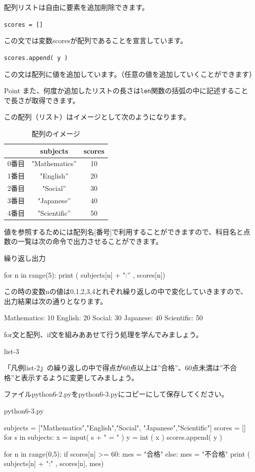 \documentclass[11pt,a4paper,dvipdfmx,titlepage]{jsreport}
\begin{document}
配列リストは自由に要素を追加削除できます。

{\tt scores = []}

この文では変数scoresが配列であることを宣言しています。

{\tt scores.append( y )}

この文は配列に値を追加しています。（任意の値を追加していくことができます）
\begin{hipoint}{Point}
また、何度か追加したリストの長さは{\tt len}関数の括弧の中に記述することで長さが取得できます。
\end{hipoint}
この配列（リスト）はイメージとして次のようになります。
\newpage
\begin{table}[h]
 \begin{center}
    \caption{配列のイメージ}
\begin{tabular}{|c|c|c|} \hline
      & subjects      & scores \\ \hline \hline
0番目  & "Mathematics” &   10	\\ \hline
1番目  & "English”     &   20 \\ \hline
2番目  & "Social”      &   30 \\ \hline
3番目  & "Japanese”    &   40 \\ \hline
4番目  & "Scientific”  &   50 \\ \hline
\end{tabular}
\end{center}
\end{table}


値を参照するためには配列名[番号]で利用することができますので、科目名と点数の一覧は次の命令で出力させることができます。

\begin{grabox}{繰り返し出力}
\begin{listing}{1}
for n in range(5):
    print ( subjects[n] + ":” , scores[n])
\end{listing}
この時の変数nの値は0,1,2,3,4とれぞれ繰り返しの中で変化していきますので、
出力結果は次の通りとなります。
\begin{listing}{1}
Mathematics: 10
English: 20
Social: 30
Japanese: 40
Scientific: 50
\end{listing}
\end{grabox}
for文と配列、if文を組みああせて行う処理を学んでみましょう。
\begin{pabox}{list-3}

「凡例list-2」の繰り返しの中で得点が60点以上は”合格”、60点未満は”不合格”と表示するように変更してみましょう。

ファイルpython6-2.pyをpython6-3.pyにコピーにして保存してください。
\begin{legbox}{python6-3.py}
\begin{listing}{1}
subjects = ["Mathematics","English","Social",
    "Japanese","Scientific"]
scores = [] 
for s in subjects:
    x = input( s + " = " )
    y = int ( x )
    scores.append( y )

for n in range(0,5):
    if scores[n] >= 60:
        mes = "合格"
    else:
        mes = "不合格"
    print ( subjects[n] + ":" , scores[n], mes)
\end{listing}
\end{legbox}
\end{pabox}
\newpage
\end{document}
